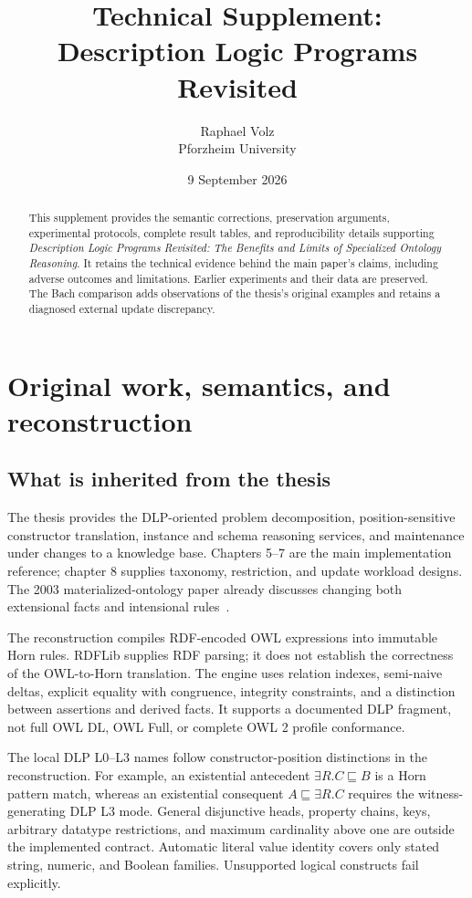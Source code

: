 \documentclass{article}
\title{Technical Supplement:\\Description Logic Programs Revisited}
\author{Raphael Volz\\Pforzheim University}
\date{9 September 2026}
\begin{document}
\maketitle
\begin{abstract}
This supplement provides the semantic corrections, preservation arguments,
experimental protocols, complete result tables, and reproducibility details
supporting \emph{Description Logic Programs Revisited: The Benefits and Limits
of Specialized Ontology Reasoning}. It retains the technical evidence behind
the main paper's claims, including adverse outcomes and limitations. Earlier
experiments and their data are preserved. The Bach comparison adds observations
of the thesis's original examples and retains a diagnosed external update
discrepancy.
\end{abstract}

\section{Original work, semantics, and reconstruction}
\subsection{What is inherited from the thesis}
The thesis provides the DLP-oriented problem decomposition, position-sensitive
constructor translation, instance and schema reasoning services, and maintenance
under changes to a knowledge base. Chapters 5--7 are the main implementation
reference; chapter 8 supplies taxonomy, restriction, and update workload designs.
The 2003 materialized-ontology paper already discusses changing both extensional
facts and intensional rules~\cite{volz2003maintenance}.

The reconstruction compiles RDF-encoded OWL expressions into immutable Horn
rules. RDFLib supplies RDF parsing; it does not establish the correctness of the
OWL-to-Horn translation. The engine uses relation indexes, semi-naive deltas,
explicit equality with congruence, integrity constraints, and a distinction
between assertions and derived facts. It supports a documented DLP fragment,
not full OWL DL, OWL Full, or complete OWL 2 profile conformance.

The local DLP L0--L3 names follow constructor-position distinctions in the
reconstruction. For example, an existential antecedent
$\exists R.C\sqsubseteq B$ is a Horn pattern match, whereas an existential
consequent $A\sqsubseteq\exists R.C$ requires the witness-generating DLP L3 mode.
General disjunctive heads, property chains, keys, arbitrary datatype restrictions,
and maximum cardinality above one are outside the implemented contract.
Automatic literal value identity covers only stated string, numeric, and Boolean
families. Unsupported logical constructs fail explicitly.
\end{document}
